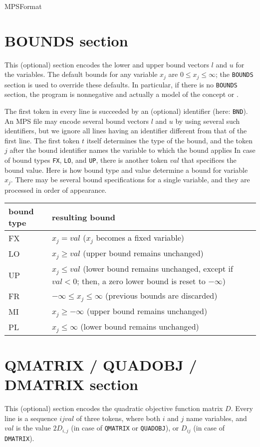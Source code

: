 \begin{ccRefConcept}{MPSFormat}
\section*{BOUNDS section}
This (optional) section encodes the lower and upper bound vectors $l$ 
and $u$ for the variables. The default bounds for any variable $x_j$ are
$0\leq x_j\leq \infty$; the
\texttt{BOUNDS} section is used to override these defaults. In particular,
if there is no \texttt{BOUNDS} section, the program is nonnegative and
actually a model of the concept  
or .

The first token in every line is succeeded by an (optional) identifier
(here: \texttt{BND}). An MPS file may encode several bound vectors $l$
and $u$ by using several such identifiers, but we ignore all lines
having an identifier different from that of the first line. The first
token $t$ itself determines the type of the bound, and the token $j$
after the bound identifier names the variable to which the bound applies
In case of bound types \texttt{FX}, \texttt{LO}, and
\texttt{UP}, there is another token $val$ that specifices the bound
value. Here is how bound type and value determine a bound for variable
$x_j$. There may be several bound specifications for a single variable, and
they are processed in order of appearance.

\begin{tabular}{l|l}
bound type & resulting bound \\ \hline
FX & $x_j = val$ ($x_j$ becomes a fixed variable) \\
LO & $x_j \geq val$ (upper bound remains unchanged) \\
UP & $x_j \leq val$ (lower bound remains unchanged, except if $val<0$; then, 
a zero lower bound is reset to $-\infty$)\\
FR & $-\infty \leq x_j\leq\infty$ (previous bounds are discarded)\\
MI & $x_j\geq -\infty$ (upper bound remains unchanged)\\
PL & $x_j\leq \infty$ (lower bound remains unchanged)    
\end{tabular}

\section*{QMATRIX / QUADOBJ / DMATRIX section}
This (optional) section encodes the quadratic objective
function matrix $D$. Every line is a sequence $i j val$ of
three tokens, where both $i$ and $j$ name variables, and
$val$ is the value $2D_{i,j}$ (in case of \texttt{QMATRIX}
or \texttt{QUADOBJ}), or $D_{ij}$ (in case of \texttt{DMATRIX}).


\end{ccRefConcept}
